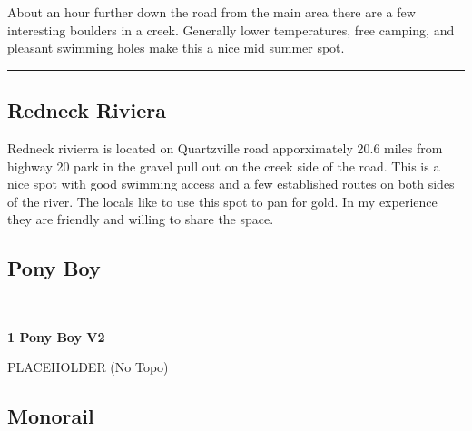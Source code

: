 \begin{multicols}{2}
\begin{minipage}{\columnwidth}
About an hour further down the road from the main area there are a few interesting boulders in a creek. Generally lower temperatures, free camping, and pleasant swimming holes make this a nice mid summer spot.
\end{minipage}

\end{multicols}
\rule{\textwidth}{1pt}
\begin{multicols}{2}
		\section{Redneck Riviera}\label{sa:Redneck Riviera}
	\begin{minipage}{\columnwidth}
	Redneck rivierra is located on Quartzville road apporximately 20.6 miles from highway 20 park in the gravel pull out on the creek side of the road. This is a nice spot with good swimming access and a few established routes on both sides of the river. The locals like to use this spot to pan for gold. In my experience they are friendly and willing to share the space.
	\end{minipage}
			\subsection*{Pony Boy}\label{bf:Pony Boy}
			\begin{minipage}{\columnwidth}
			\
			\end{minipage}
			
					\begin{minipage}{\linewidth}	
					\label{rt:Pony Boy}\colorbox{green!20}{\textbf{1 Pony Boy V2  }}
					\begin{adjustwidth}{0.5cm}{}				
					PLACEHOLDER
						\newline (No Topo) 
					\end{adjustwidth}
					\end{minipage}
			\subsection*{Monorail}\label{bf:Monorail}
			\begin{minipage}{\columnwidth}
			\
			\end{minipage}
			

\end{multicols}
